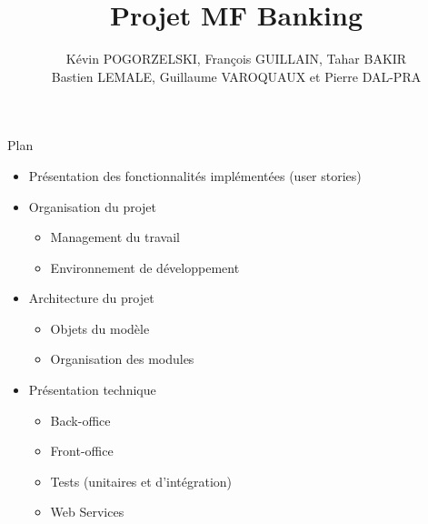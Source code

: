 \documentclass{beamer}
\title{Projet MF Banking}
\author{K\'evin POGORZELSKI, Fran\c cois GUILLAIN, Tahar BAKIR\\ Bastien LEMALE, Guillaume VAROQUAUX et Pierre DAL-PRA}
\begin{document}
\begin{frame}
	\maketitle
\end{frame}

\begin{frame}{Plan}
	\begin{itemize}
		\item Pr\'esentation des fonctionnalit\'es impl\'ement\'ees (user stories) 
		\item Organisation du projet
			\begin{itemize}
				\item Management du travail
				\item Environnement de d\'eveloppement
			\end{itemize}
		\item Architecture du projet
			\begin{itemize}
				\item Objets du mod\`ele
				\item Organisation des modules
			\end{itemize}
		\item Pr\'esentation technique
			\begin{itemize}
				\item Back-office
				\item Front-office
				\item Tests (unitaires et d'int\'egration)
				\item Web Services
			\end{itemize}
	\end{itemize}
\end{frame}





\end{document}
